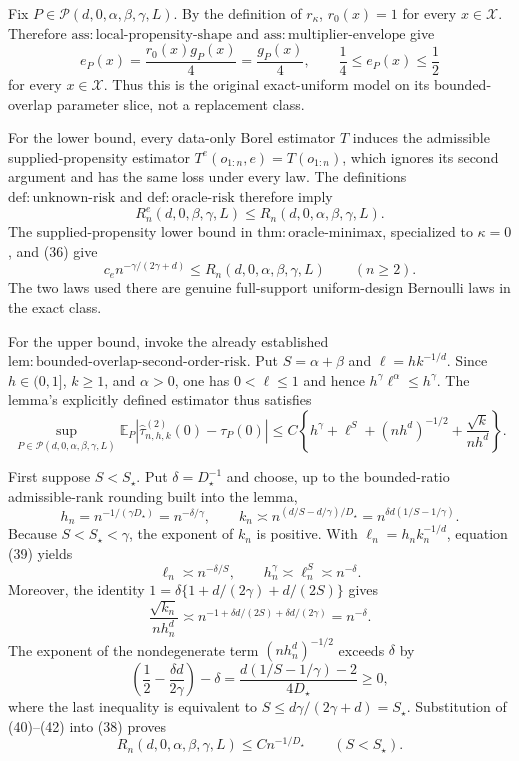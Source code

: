 Fix \(P\in\mathcal P(d,0,\alpha,\beta,\gamma,L)\).  By the definition of \(r_{\kappa}\), \(r_0(x)=1\) for every \(x\in\mathcal X\).  Therefore \(\mathrm{ass:local\mbox{-}propensity\mbox{-}shape}\) and \(\mathrm{ass:multiplier\mbox{-}envelope}\) give
\[
 e_P(x)=\frac{r_0(x)g_P(x)}4=\frac{g_P(x)}4,
 \qquad
 \frac14\leq e_P(x)\leq\frac12
 \tag{35}
\]
for every \(x\in\mathcal X\).  Thus this is the original exact-uniform model on its bounded-overlap parameter slice, not a replacement class.

For the lower bound, every data-only Borel estimator \(T\) induces the admissible supplied-propensity estimator \(T^e(o_{1:n},e)=T(o_{1:n})\), which ignores its second argument and has the same loss under every law.  The definitions \(\mathrm{def:unknown\mbox{-}risk}\) and \(\mathrm{def:oracle\mbox{-}risk}\) therefore imply
\[
 R_n^e(d,0,\beta,\gamma,L)
 \leq R_n(d,0,\alpha,\beta,\gamma,L).
 \tag{36}
\]
The supplied-propensity lower bound in \(\mathrm{thm:oracle\mbox{-}minimax}\), specialized to \(\kappa=0\), and (36) give
\[
 c_e n^{-\gamma/(2\gamma+d)}
 \leq R_n(d,0,\alpha,\beta,\gamma,L)
 \qquad(n\geq2).
 \tag{37}
\]
The two laws used there are genuine full-support uniform-design Bernoulli laws in the exact class.

For the upper bound, invoke the already established \(\mathrm{lem:bounded\mbox{-}overlap\mbox{-}second\mbox{-}order\mbox{-}risk}\).  Put \(S=\alpha+\beta\) and \(\ell=hk^{-1/d}\).  Since \(h\in(0,1]\), \(k\geq1\), and \(\alpha>0\), one has \(0<\ell\leq1\) and hence \(h^\gamma\ell^\alpha\leq h^\gamma\).  The lemma's explicitly defined estimator thus satisfies
\[
 \sup_{P\in\mathcal P(d,0,\alpha,\beta,\gamma,L)}
 \mathbb E_P\left|\widehat\tau^{(2)}_{n,h,k}(0)-\tau_P(0)\right|
 \leq C\left\{h^\gamma+\ell^S+(nh^d)^{-1/2}
 +\frac{\sqrt{k}}{nh^d}\right\}.
 \tag{38}
\]

First suppose \(S<S_\star\).  Put \(\delta=D_\star^{-1}\) and choose, up to the bounded-ratio admissible-rank rounding built into the lemma,
\[
 h_n=n^{-1/(\gamma D_\star)}=n^{-\delta/\gamma},
 \qquad
 k_n\asymp n^{(d/S-d/\gamma)/D_\star}
 =n^{\delta d(1/S-1/\gamma)}.
 \tag{39}
\]
Because \(S<S_\star<\gamma\), the exponent of \(k_n\) is positive.  With \(\ell_n=h_nk_n^{-1/d}\), equation (39) yields
\[
 \ell_n\asymp n^{-\delta/S},
 \qquad
 h_n^\gamma\asymp\ell_n^S\asymp n^{-\delta}.
 \tag{40}
\]
Moreover, the identity \(1=\delta\{1+d/(2\gamma)+d/(2S)\}\) gives
\[
 \frac{\sqrt{k_n}}{nh_n^d}
 \asymp n^{-1+\delta d/(2S)+\delta d/(2\gamma)}
 =n^{-\delta}.
 \tag{41}
\]
The exponent of the nondegenerate term \((nh_n^d)^{-1/2}\) exceeds \(\delta\) by
\[
 \left(\frac12-\frac{\delta d}{2\gamma}\right)-\delta
 =\frac{d(1/S-1/\gamma)-2}{4D_\star}\geq0,
 \tag{42}
\]
where the last inequality is equivalent to \(S\leq d\gamma/(2\gamma+d)=S_\star\).  Substitution of (40)--(42) into (38) proves
\[
 R_n(d,0,\alpha,\beta,\gamma,L)\leq Cn^{-1/D_\star}
 \qquad(S<S_\star).
 \tag{43}
\]

